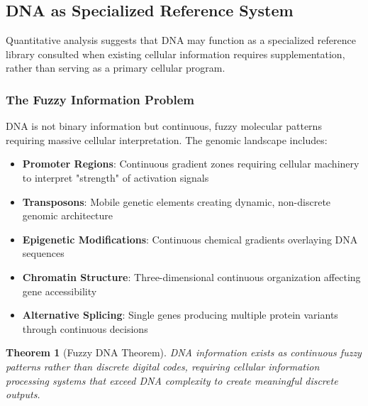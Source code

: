 \documentclass[12pt,a4paper]{article}
\newtheorem{theorem}{Theorem}[section]
\begin{document}
\subsection{DNA as Specialized Reference System}

Quantitative analysis suggests that DNA may function as a specialized reference library consulted when existing cellular information requires supplementation, rather than serving as a primary cellular program.

\subsubsection{The Fuzzy Information Problem}

DNA is not binary information but continuous, fuzzy molecular patterns requiring massive cellular interpretation. The genomic landscape includes:

\begin{itemize}
\item \textbf{Promoter Regions}: Continuous gradient zones requiring cellular machinery to interpret "strength" of activation signals
\item \textbf{Transposons}: Mobile genetic elements creating dynamic, non-discrete genomic architecture
\item \textbf{Epigenetic Modifications}: Continuous chemical gradients overlaying DNA sequences
\item \textbf{Chromatin Structure}: Three-dimensional continuous organization affecting gene accessibility
\item \textbf{Alternative Splicing}: Single genes producing multiple protein variants through continuous decisions
\end{itemize}

\begin{theorem}[Fuzzy DNA Theorem]
DNA information exists as continuous fuzzy patterns rather than discrete digital codes, requiring cellular information processing systems that exceed DNA complexity to create meaningful discrete outputs.
\end{theorem}
\end{document}
